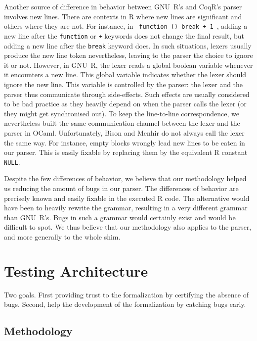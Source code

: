 \documentclass[
    sigplan,
    10pt,
    review, %
    natbib=false %
 ]{acmart}
\newcommand\CoqR{CoqR}
\begin{document}
Another source of difference in behavior
between GNU~R's and \CoqR{}'s parser
involves new lines.
There are contexts in R where new lines are significant
and others where they are not.
For instance, in \texttt{{ function () break + 1 }},
adding a new line after the \texttt{function} or \texttt{+} keywords
does not change the final result,
but adding a new line after the \texttt{break} keyword does.
%
In such situations, lexers usually produce the new line token
nevertheless, leaving to the parser the choice to ignore it or not.
However, in GNU~R, the lexer reads a global boolean variable %
whenever it encounters a new line.
This global variable indicates whether the lexer should ignore the new line.
This variable is controlled by the parser:
the lexer and the parser thus communicate through side-effects.
%
Such effects are usually considered to be bad practice
as they heavily depend on when the parser calls the lexer
(or they might get synchronised out).
%
To keep the line-to-line correspondence,
we nevertheless built the same communication channel
between the lexer and the parser in OCaml.
Unfortunately, Bison and Menhir do not always call the lexer
the same way.
%
For instance, empty blocks \texttt{{}} wrongly
lead new lines to be eaten in our parser.
This is easily fixable by replacing them
by the equivalent R constant \texttt{NULL}.

Despite the few differences of behavior,
we believe that our methodology helped us
reducing the amount of bugs in our parser.
The differences of behavior are precisely known
and easily fixable in the executed R code.
%
The alternative would have been
to heavily rewrite the grammar,
resulting in a very different grammar than GNU~R's.
Bugs in such a grammar would certainly exist
and would be difficult to spot.
%
We thus believe that our methodology also applies to the parser,
and more generally to the whole shim.


\section{Testing Architecture}
\label{sec:testing:architecture}

\todo{}

Two goals.
First providing trust to the formalization by certifying the absence of bugs.
Second, help the development of the formalization by catching bugs early.

\subsection{Methodology}
\label{sec:test:methodology}
\end{document}
